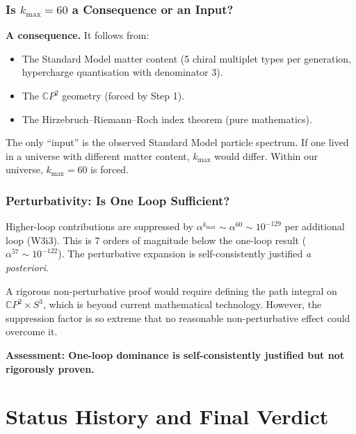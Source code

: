 \documentclass[11pt,a4paper]{article}
\newcommand{\CP}{\mathbb{C}P}
\newcommand{\alphafine}{\alpha}
\begin{document}
\section{Is $k_{\max} = 60$ a Consequence or an Input?}
\label{sec:kmax}

\textbf{A consequence.} It follows from:
\begin{itemize}[nosep]
\item The Standard Model matter content (5 chiral multiplet types per
  generation, hypercharge quantisation with denominator 3).
\item The $\CP^2$ geometry (forced by Step 1).
\item The Hirzebruch--Riemann--Roch index theorem (pure mathematics).
\end{itemize}

The only ``input'' is the observed Standard Model particle spectrum. If
one lived in a universe with different matter content, $k_{\max}$ would
differ. Within our universe, $k_{\max} = 60$ is forced.

\section{Perturbativity: Is One Loop Sufficient?}
\label{sec:perturbativity}

Higher-loop contributions are suppressed by
$\alphafine^{k_{\max}} \sim \alphafine^{60} \sim 10^{-129}$ per
additional loop (W3i3). This is 7 orders of magnitude below the
one-loop result ($\alphafine^{57} \sim 10^{-122}$). The perturbative
expansion is self-consistently justified \textit{a posteriori}.

A rigorous non-perturbative proof would require defining the path
integral on $\CP^2 \times S^3$, which is beyond current mathematical
technology. However, the suppression factor is so extreme that no
reasonable non-perturbative effect could overcome it.

\textbf{Assessment: One-loop dominance is self-consistently justified
but not rigorously proven.}

\part{Status History and Final Verdict}
\label{part:verdict}
\end{document}
